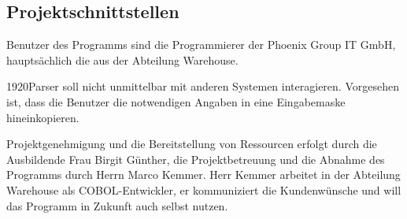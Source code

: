 \subsection{Projektschnittstellen}
\label{sec:Projektschnittstellen}
Benutzer des Programms sind die Programmierer der Phoenix Group IT GmbH, hauptsächlich die aus der Abteilung Warehouse.

1920Parser soll nicht unmittelbar mit anderen Systemen interagieren. Vorgesehen ist, dass die Benutzer die notwendigen Angaben in eine Eingabemaske hineinkopieren.

Projektgenehmigung und die Bereitstellung von Ressourcen erfolgt durch die Ausbildende Frau Birgit Günther, die Projektbetreuung und die Abnahme des Programms durch Herrn Marco Kemmer. Herr Kemmer arbeitet in der Abteilung Warehouse als COBOL-Entwickler, er kommuniziert die Kundenwünsche und will das Programm in Zukunft auch selbst nutzen.




